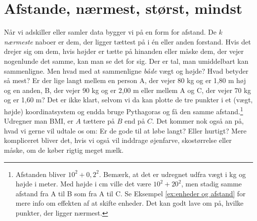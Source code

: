 \documentclass[a4paper, 12pt]{article}
\theoremstyle{remark}
\begin{document}
\section*{Afstande, nærmest, størst, mindst}
Når vi adskiller eller samler data bygger vi på en form for afstand. De $k$ \emph{ nærmeste} naboer er dem, der ligger tættest på i én eller anden forstand. 
Hvis det drejer sig om dem, hvis højder er tætte på hinanden eller måske dem, der vejer nogenlunde det samme, kan man se det for sig. 
Der er tal, man umiddelbart kan sammenligne. Men hvad med at sammenligne \emph{både} vægt og højde? Hvad betyder så mest? 
Er der lige langt mellem en person A, der vejer 80 kg og er 1,80 m høj og en anden, B,  der vejer 90 kg og er 2,00 m eller mellem A og C, der vejer 70 kg og er 1,60 m? 
Det er ikke klart, selvom vi da kan plotte de tre punkter i et (vægt, højde) koordinatsystem og endda bruge Pythagoras og få den samme afstand.\footnote{Afstanden bliver $10^2+0,2^2$. Bemærk, at det er udregnet udfra vægt i kg og højde i meter. Med højde i cm ville det være $10^2+20^2$, men stadig samme afstand fra A til B som fra A til C. Se Eksempel \ref{ex:enheder og afstand} for mere info om effekten af at skifte enheder. Det kan godt lave om på, hvilke punkter, der ligger nærmest.}
Udregner man BMI, er $A$ tættere på $B$ end på $C$.
Det kommer nok også an på, hvad vi gerne vil udtale os om: Er de gode til at løbe langt? Eller hurtigt? Mere kompliceret bliver det, hvis vi også vil inddrage øjenfarve, skostørrelse eller måske, om de køber rigtig meget mælk.
\end{document}

